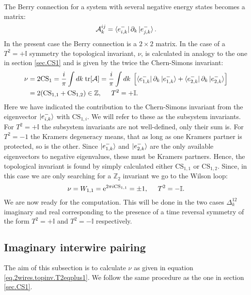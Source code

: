 The Berry connection for a system with several negative energy states becomes a matrix:
\begin{equation}
\mathcal{A}^{ij}_k = \bra{e^{-}_{i,k}}\partial_k\ket{e^{-}_{j,k}}.
\end{equation}
In the present case the Berry connection is a $2\times 2$ matrix. In the case of a $T^2 = + \mathbb{I}$ symmetry the topological invariant, $\nu$, is calculated in analogy to the one in section \ref{sec.CS1} and is given by the twice the Chern-Simons invariant:
\begin{align}
\nu &= 2\text{CS}_1 = \frac{i}{\pi} \int dk\; \text{tr}[\mathcal{A}] = \frac{i}{\pi} \int dk\; \left[\bra{e^{-}_{1,k}}\partial_k\ket{e^{-}_{1,k}} + \bra{e^{-}_{2,k}}\partial_k\ket{e^{-}_{2,k}}  \right] \nonumber \\
 &= 2(\text{CS}_{1,1} + \text{CS}_{1,2})\in \mathbb{Z}, \hspace{0.5cm} T^2 = +\mathbb{I}.
\label{eq.2wires.topinv.T2eqplus1}
\end{align}
Here we have indicated the contribution to the Chern-Simons invariant from the eigenvector $\ket{e^{-}_{i,k}}$ with $\text{CS}_{1,i}$. We will refer to these as the subsystem invariants. For $T^2 = +\mathbb{I}$ the subsystem invariants are not well-defined, only their sum is. For $T^2 = -1$ the Kramers degeneracy means, that as long as one Kramers partner is protected, so is the other. Since $\ket{e^{-}_{1,k}}$ and $\ket{e^{-}_{2,k}}$ are the only available eigenvectors to negative eigenvalues, these must be Kramers partners. Hence, the topological invariant is found by simply calculated either $\text{CS}_{1,1}$ or $\text{CS}_{1,2}$\cite{FuKane2006, LiYangChen}. Since, in this case we are only searching for a $\mathbb{Z}_2$ invariant we go to the Wilson loop:
\begin{equation}
\nu = W_{1,1} = \text{e}^{2\pi i\text{CS}_{1,1}} = \pm 1, \hspace{0.5cm} T^2 = -\mathbb{I}.
\label{eq.2wires.topinv.T2eqminus1}
\end{equation}
We are now ready for the computation. This will be done in the two cases $\Delta^{12}_k$ imaginary and real corresponding to the presence of a time reversal symmetry of the form $T^2 = +\mathbb{I}$ and $T^2 = -\mathbb{I}$ respectively. 

\subsection{Imaginary interwire pairing}
\label{subsec.2wires_CSinv_Delta12imag}
The aim of this subsection is to calculate $\nu$ as given in equation \eqref{eq.2wires.topinv.T2eqplus1}. We follow the same procedure as the one in section \ref{sec.CS1}. 

